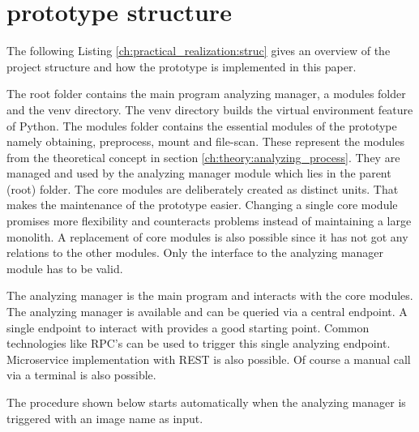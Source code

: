 \section{prototype structure}
\label{ch:practical_realization:prot_struct}
The following Listing \ref{ch:practical_realization:struc} gives an overview of the project structure and how the prototype is implemented in this paper.

The root folder contains the main program analyzing manager, a modules folder and the venv directory.
The venv directory builds the virtual environment feature of Python. 
The modules folder contains the essential modules of the prototype namely obtaining, preprocess, mount and file-scan.
These represent the modules from the theoretical concept in section \ref{ch:theory:analyzing_process}.
They are managed and used by the analyzing manager module which lies in the parent (root) folder. 
The core modules are deliberately created as distinct units. 
That makes the maintenance of the prototype easier. 
Changing a single core module promises more flexibility and counteracts problems instead of maintaining a large monolith. 
A replacement of core modules is also possible since it has not got any relations to the other modules. 
Only the interface to the analyzing manager module has to be valid.

The analyzing manager is the main program and interacts with the core modules. 
The analyzing manager is available and can be queried via a central endpoint.
A single endpoint to interact with provides a good starting point. 
Common technologies like RPC's can be used to trigger this single analyzing endpoint. 
Microservice implementation with REST is also possible.
Of course a manual call via a terminal is also possible.

The procedure shown below starts automatically when the analyzing manager is triggered with an image name as input.

